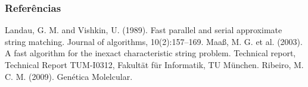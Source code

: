 \documentclass[10pt, compress]{beamer}
\begin{document}
\begin{frame}[fragile]
	\frametitle{Referências}
    \begin{thebibliography}{9}
		 Landau, G. M. and Vishkin, U. (1989). Fast parallel and serial approximate string matching.
Journal of algorithms, 10(2):157–169.
		 Maaß, M. G. et al. (2003). A fast algorithm for the inexact characteristic string problem.
Technical report, Technical Report TUM-I0312, Fakultät für Informatik, TU München.
		 Ribeiro, M. C. M. (2009). Genética Molelcular.
    \end{thebibliography}
\end{frame}
\end{document}
